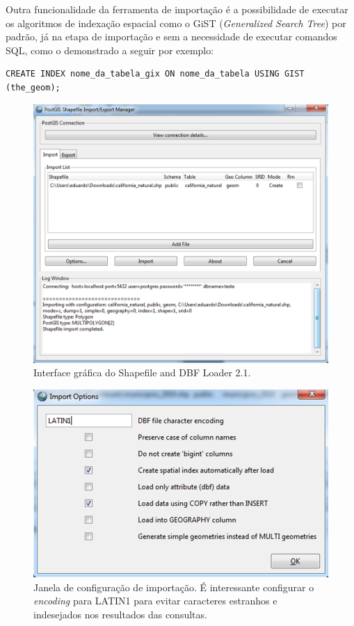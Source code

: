 Outra funcionalidade da ferramenta de importação é a possibilidade de executar os algoritmos de indexação espacial como o GiST (\textit{Generalized Search Tree}) por padrão, já na etapa de importação e sem a necessidade de executar comandos SQL, como o demonstrado a seguir por exemplo:
	
	\begin{lstlisting}[float,floatplacement=H]
		CREATE INDEX nome_da_tabela_gix ON nome_da_tabela USING GIST (the_geom);
	\end{lstlisting}

	\begin{figure}
		\centering
		\includegraphics[width=1\linewidth]{data/shapefile_loader_gui}
		\caption{Interface gráfica do Shapefile and DBF Loader 2.1.}
		\label{fig:shapefileloadergui}
	\end{figure}
	
	\begin{figure}
		\centering
		\includegraphics[width=1\linewidth]{data/import_config}
		\caption{Janela de configuração de importação. É interessante configurar o \textit{encoding} para LATIN1 para evitar caracteres estranhos e indesejados nos resultados das consultas.}
		\label{fig:importconfig}
	\end{figure}

